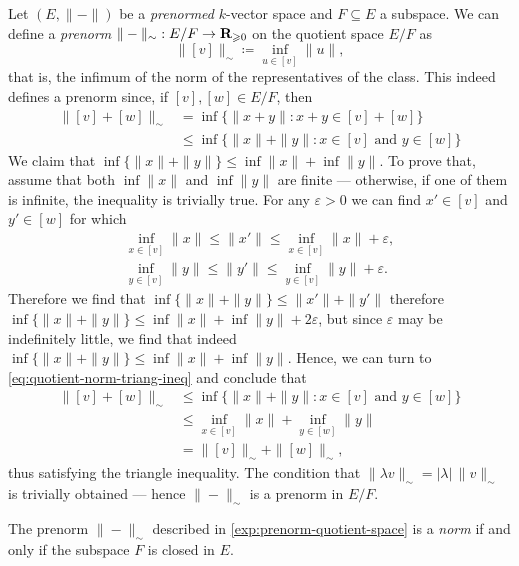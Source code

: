 \begin{example}
\label{exp:prenorm-quotient-space}
Let \((E, \| - \|)\) be a \emph{prenormed} \(k\)-vector space and \(F
\subseteq E\) a subspace. We can define a \emph{prenorm} \(\| - \|_{\sim}: E/F
\to \mathbf{R}_{\geqslant 0}\) on the quotient space \(E/F\) as
\[
  \| [v] \|_{\sim} \coloneq \inf_{u \in [v]} \| u \|,
\]
that is, the infimum of the norm of the representatives of the class. This
indeed defines a prenorm since, if \([v], [w] \in E/F\), then
\begin{align}\label{eq:quotient-norm-triang-ineq}
  \nonumber
  \| [v] + [w] \|_{\sim}
  &= \inf \{\|x + y\| \colon x + y \in [v] + [w]\} \\
  &\leq \inf \{\| x \| + \| y \| \colon x \in [v] \text{ and } y \in [w]\}
\end{align}
We claim that \(\inf \{\| x \| + \| y \|\} \leq \inf \| x \| + \inf \| y
\|\). To prove that, assume that both \(\inf \| x \|\) and \(\inf \| y \|\) are
finite --- otherwise, if one of them is infinite, the inequality is trivially
true. For any \(\varepsilon > 0\) we can find \(x' \in [v]\) and \(y' \in
[w]\) for which
\begin{gather*}
\inf_{x \in [v]} \| x \|
\leq \| x' \|
\leq \inf_{x \in [v]} \| x \| + \varepsilon,
\\
\inf_{y \in [v]} \| y \|
\leq \| y' \|
\leq \inf_{y \in [v]} \| y \| + \varepsilon.
\end{gather*}
Therefore we find that \(\inf \{\| x \| + \| y \|\} \leq \| x' \| + \| y' \|\)
therefore \(\inf \{\| x \| + \| y \|\} \leq \inf \| x \| + \inf \| y \| + 2
\varepsilon\), but since \(\varepsilon\) may be indefinitely little, we find
that indeed \(\inf \{\| x \| + \| y \|\} \leq \inf \| x \| + \inf \| y
\|\). Hence, we can turn to \cref{eq:quotient-norm-triang-ineq} and conclude
that
\begin{align*}
\| [v] + [w] \|_{\sim}
&\leq \inf \{\| x \| + \| y \| \colon x \in [v] \text{ and } y \in [w]\} \\
&\leq \inf_{x \in [v]} \| x \| + \inf_{y \in [w]} \| y \| \\
&= \| [v] \|_{\sim} + \| [w] \|_{\sim},
\end{align*}
thus satisfying the triangle inequality. The condition that \(\| \lambda v
\|_{\sim} = |\lambda|\, \| v \|_{\sim}\) is trivially obtained --- hence \(\| -
\|_{\sim}\) is a prenorm in \(E/F\).
\end{example}

\begin{proposition}
\label{prop:quotient-norm}
The prenorm \(\| - \|_{\sim}\) described in \cref{exp:prenorm-quotient-space} is
a \emph{norm} if and only if the subspace \(F\) is closed in \(E\).
\end{proposition}

